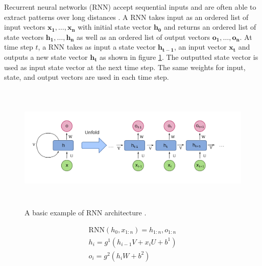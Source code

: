 \documentclass[a4paper, 11pt]{article}
\begin{document}
Recurrent neural networks (RNN) accept sequential inputs and are often able to extract patterns over long distances \parencite{Elman}. A RNN takes input as an ordered list of input vectors $\mathrm{\mathbf{x_1},\dots,\mathbf{x_n}}$ with initial state vector $\mathbf{h_0}$ and returns an ordered list of state vectors $\mathrm{\mathbf{h_1},\dots,\mathbf{h_n}}$ as well as an ordered list of output vectors $\mathrm{\mathbf{o_1},\dots,\mathbf{o_n}}$. At time step $t$, a RNN takes as input a state vector $\mathbf{h_{t-1}}$, an input vector $\mathbf{x_{t}}$ and outputs a new state vector $\mathbf{h_{t}}$ as shown in figure \ref{fig:A basic RNN architecture}. The outputted state vector is used as input state vector at the next time step. The same weights for input, state, and output vectors are used in each time step.  


\begin{figure}[htpb!]
    \centering
    \includegraphics[width=\textwidth,height=6cm,keepaspectratio=true]
    {Recurrent_neural_network_unfold.png}
    \caption{
        A basic example of RNN architecture \parencite{rnn-1}.
    }
    \label{fig:A basic RNN architecture}
\end{figure}

\begin{align*}
\mathrm{RNN}(h_0,x_{1:n}) = h_{1:n}, o_{1:n} \\
h_i = g^1(h_{i-1}V + x_iU + b^1) \\
o_i = g^2(h_iW + b^2) 
\end{align*}
\end{document}
